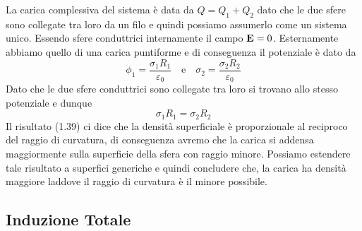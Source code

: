 La carica complessiva del sistema \`e data da $Q = Q_1 + Q_2$ dato che le due sfere sono collegate tra loro da un filo e quindi possiamo assumerlo come un sistema unico. Essendo sfere conduttrici internamente il campo $\bold{E} = 0$. Esternamente abbiamo quello di una carica puntiforme e di conseguenza il potenziale \`e dato da
\begin{equation*}
	\phi_1 = \frac{\sigma_1 R_1}{\varepsilon_0} \quad \text{e} \quad \sigma_2 = \frac{\sigma_2 R_2}{\varepsilon_0}
\end{equation*}
Dato che le due sfere conduttrici sono collegate tra loro si trovano allo stesso potenziale e dunque 
\begin{equation}
	\sigma_1R_1 =\sigma_2R_2
\end{equation}
Il risultato (1.39) ci dice che la densit\`a superficiale \`e proporzionale al reciproco del raggio di curvatura, di conseguenza avremo che la carica si addensa maggiormente sulla superficie della sfera con raggio  minore. Possiamo estendere tale risultato a superfici generiche e quindi concludere che, la carica ha densit\`a maggiore laddove il raggio di curvatura \`e il minore possibile.

\subsection{Induzione Totale}


